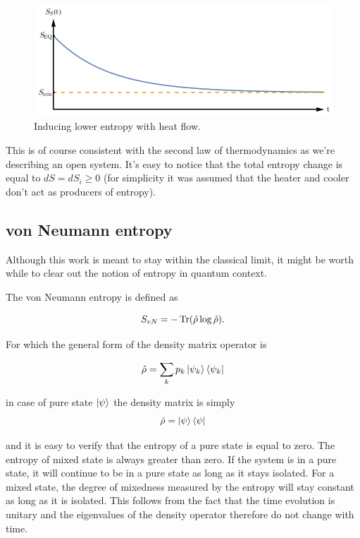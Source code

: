 \documentclass[a4paper,12pt]{article}
\begin{document}
\begin{figure}[ht!]
\centering \includegraphics[width=12cm]{wykres3} 
\caption{Inducing lower entropy with heat flow.}
\label{Fig4} 
\end{figure}

This is of course consistent with the second law of thermodynamics as we're describing an open system.
It's easy to notice that the total entropy change is equal to $dS=dS_i \geq 0$ (for simplicity it was assumed that the heater and cooler don't act as producers of entropy).

\subsection{von Neumann entropy}

Although this work is meant to stay within the classical limit, it might be worth while to clear out the notion of entropy in quantum context.

The von Neumann entropy is defined as 

\begin{equation}
  S_{vN}= -\Tr(\hat{\rho} \log{\hat{\rho}}).
\end{equation}

For which the general form of the density matrix operator is

\begin{equation}
	\hat{\rho}=\sum_k p_k \ket{\psi_k}\bra{\psi_k} 
\end{equation}

in case of pure state $\ket{\psi}$ the density matrix is simply
\begin{equation}
  \hat{\rho} = \ket{\psi}\bra{\psi}
\end{equation}

and it is easy to verify that the entropy of a pure state is equal to zero. The entropy of mixed state is always greater than zero.
If the system is in a pure state, it will continue to be in a pure state as long as it stays isolated. For a mixed state, the degree of mixedness measured by the entropy will stay constant as long as it is isolated. This follows from the fact that the time evolution is unitary and the eigenvalues of the density operator therefore do not change with time.
\end{document}
